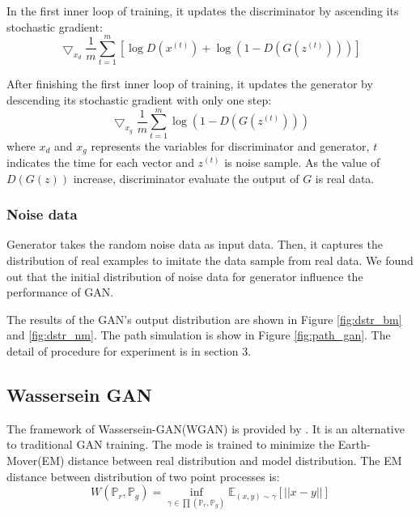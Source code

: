 \documentclass{article}
\begin{document}
	In the first inner loop of training, 
	it updates the discriminator by ascending its stochastic gradient:
	\begin{equation}
		\bigtriangledown_{x_d} \frac{1}{m} \sum_{t=1}^{m} \left[ \log D(x^{\left(t\right)}) + \log \left(1-D\left(G\left(z^{(t)}\right)\right)\right)\right]
	\end{equation}
	
	After finishing the first inner loop of training, it updates the generator by descending its stochastic gradient with only one step:
	\begin{equation}
		\bigtriangledown_{x_g} \frac{1}{m} \sum_{t=1}^{m} \log \left(1-D\left(G\left(z^{(t)}\right)\right)\right)
		\label{fig:loss_gan}
	\end{equation}
	where $x_d$ and $x_g$ represents the variables for discriminator and generator, $t$ indicates the time for each vector and $z^{(t)}$ is noise sample.
	As the value of $D(G(z))$ increase, discriminator evaluate the output of $G$ is real data. 
	
	\subsubsection{Noise data}
	Generator  takes the random noise data as input data. 
	Then, it captures the distribution of real examples to imitate the data sample from real data. 
	We found out that the initial distribution of noise data for generator influence the performance of GAN. 
	
	The results of the GAN's output distribution are shown in Figure \ref{fig:dstr_bm} and \ref{fig:dstr_nm}. The path simulation is show in Figure \ref{fig:path_gan}. The detail of procedure for experiment is in section 3. 
	
	\subsection{Wassersein GAN}
	The framework of Wassersein-GAN(WGAN) is provided by \cite{arjovsky}. 
	It is an alternative to traditional GAN training.
	The mode is trained to minimize the Earth-Mover(EM) distance between real distribution and model distribution.
	The EM distance between distribution of two point processes is:
	\begin{equation}
		W(\mathbb{P}_r, \mathbb{P}_g) = \inf_{\gamma \in \prod(\mathbb{P}_r, \mathbb{P}_g)} \mathbb{E}_{(x,y)\sim \gamma}\left[||x-y||\right]
	\end{equation}
	
\end{document}
